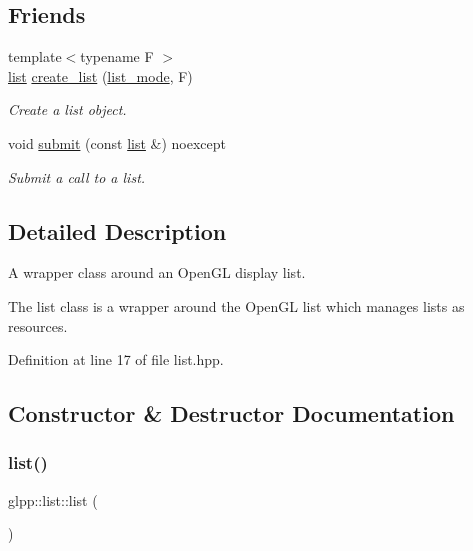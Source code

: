 \subsection*{Friends}
\begin{DoxyCompactItemize}
\item 
{\footnotesize template$<$typename F $>$ }\\\hyperlink{classglpp_1_1list}{list} \hyperlink{classglpp_1_1list_a627197fd6510c899fb15354dae0ee58c}{create\+\_\+list} (\hyperlink{namespaceglpp_ae04b58b8004d97440233b5c65fe75748}{list\+\_\+mode}, F)
\begin{DoxyCompactList}\small\item\em Create a list object. \end{DoxyCompactList}\item 
void \hyperlink{classglpp_1_1list_acbdbed9fe36925d2ef6f6fe114a32d9d}{submit} (const \hyperlink{classglpp_1_1list}{list} \&) noexcept
\begin{DoxyCompactList}\small\item\em Submit a call to a list. \end{DoxyCompactList}\end{DoxyCompactItemize}


\subsection{Detailed Description}
A wrapper class around an Open\+GL display list. 

The list class is a wrapper around the Open\+GL list which manages lists as resources. 

Definition at line 17 of file list.\+hpp.



\subsection{Constructor \& Destructor Documentation}
\mbox{\label{classglpp_1_1list_adf35376b2885cf8a455cf0611b6a6df2}} 
\subsubsection{\texorpdfstring{list()}{list()}\hspace{0.1cm}{\footnotesize\ttfamily [1/3]}}
{\footnotesize\ttfamily glpp\+::list\+::list (\begin{DoxyParamCaption}{ }\end{DoxyParamCaption})\hspace{0.3cm}{\ttfamily [noexcept]}}



